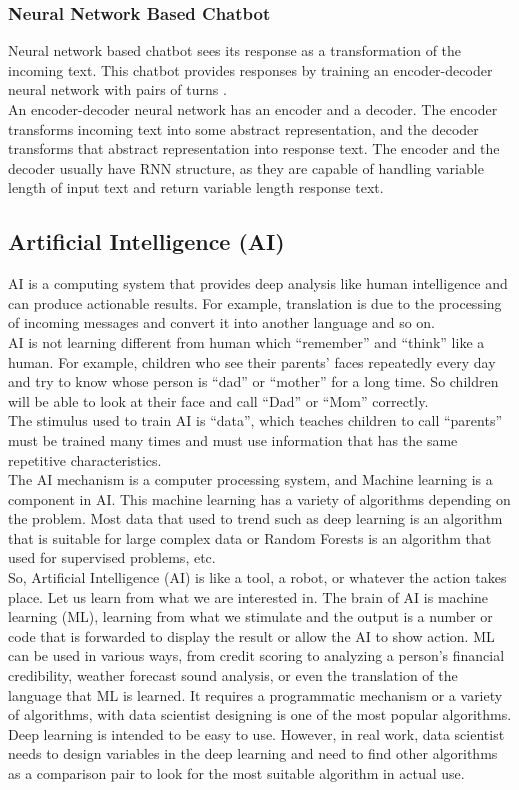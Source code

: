 \documentclass[12pt,oneside,openright,a4paper]{cpe-english-project}
\begin{document}
\subsubsection{Neural Network Based Chatbot}
Neural network based chatbot sees its response as a transformation of the incoming text. This chatbot
provides responses by training an encoder-decoder neural network with pairs of turns \cite{five_types_of_chatbot,rule_based_vs_nlp}.\\
An encoder-decoder neural network has an encoder and a decoder. The encoder transforms incoming
text into some abstract representation, and the decoder transforms that abstract representation
into response text. The encoder and the decoder usually have RNN structure, as they are capable
of handling variable length of input text and return variable length response text.

\subsection{Artificial Intelligence (AI)}
AI is a computing system that provides deep analysis like human intelligence and can produce
actionable results. For example, translation is due to the processing of incoming messages
and convert it into another language and so on.\\
AI is not learning different from human which “remember” and “think” like a human.
For example, children who see their parents' faces repeatedly every day and try to know whose
person is “dad” or “mother” for a long time. So children will be able to look at their face and
call “Dad” or “Mom” correctly.\\
The stimulus used to train AI is “data”, which teaches children to call “parents” must be trained
many times and must use information that has the same repetitive characteristics\cite{machine_learning_vs_deep_learning}.\\
The AI mechanism is a computer processing system, and Machine learning is a component in AI.
This machine learning has a variety of algorithms depending on the problem. Most data that used to
trend such as deep learning is an algorithm that is suitable for large complex data or Random Forests
is an algorithm that used for supervised problems, etc.\\
So, Artificial Intelligence (AI) is like a tool, a robot, or whatever the action takes place.
Let us learn from what we are interested in. The brain of AI is machine learning (ML),
learning from what we stimulate and the output is a number or code that is forwarded to display
the result or allow the AI to show action. ML can be used in various ways, from credit scoring
to analyzing a person's financial credibility, weather forecast sound analysis, or even the
translation of the language that ML is learned. It requires a programmatic mechanism or a variety
of algorithms, with data scientist designing is one of the most popular algorithms.\\
Deep learning is intended to be easy to use. However, in real work, data scientist needs to
design variables in the deep learning and need to find other algorithms as a comparison pair
to look for the most suitable algorithm in actual use.
\end{document}
